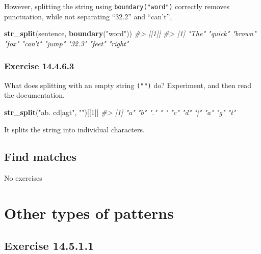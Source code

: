 \documentclass[]{book}
\newenvironment{Shaded}{\begin{snugshade}}{\end{snugshade}}
\newcommand{\CommentTok}[1]{\textcolor[rgb]{0.56,0.35,0.01}{\textit{#1}}}
\newcommand{\DecValTok}[1]{\textcolor[rgb]{0.00,0.00,0.81}{#1}}
\newcommand{\KeywordTok}[1]{\textcolor[rgb]{0.13,0.29,0.53}{\textbf{#1}}}
\newcommand{\NormalTok}[1]{#1}
\newcommand{\StringTok}[1]{\textcolor[rgb]{0.31,0.60,0.02}{#1}}
\theoremstyle{plain}
\theoremstyle{remark}
\begin{document}
However, splitting the string using \texttt{boundary("word")} correctly
removes punctuation, while not separating ``32.2'' and ``can't'',

\begin{Shaded}
\begin{Highlighting}[]
\KeywordTok{str_split}\NormalTok{(sentence, }\KeywordTok{boundary}\NormalTok{(}\StringTok{"word"}\NormalTok{))}
\CommentTok{#> [[1]]}
\CommentTok{#> [1] "The"   "quick" "brown" "fox"   "can’t" "jump"  "32.3"  "feet"  "right"}
\end{Highlighting}
\end{Shaded}

\hypertarget{exercise-14.4.6.3}{%
\subsubsection*{\texorpdfstring{Exercise
{14.4.6.3}}{Exercise 14.4.6.3}}\label{exercise-14.4.6.3}}

What does splitting with an empty string \texttt{("")} do? Experiment,
and then read the documentation.

\begin{Shaded}
\begin{Highlighting}[]
\KeywordTok{str_split}\NormalTok{(}\StringTok{"ab. cd|agt"}\NormalTok{, }\StringTok{""}\NormalTok{)[[}\DecValTok{1}\NormalTok{]]}
\CommentTok{#>  [1] "a" "b" "." " " "c" "d" "|" "a" "g" "t"}
\end{Highlighting}
\end{Shaded}

It splits the string into individual characters.

\hypertarget{find-matches}{%
\subsection{Find matches}\label{find-matches}}

No exercises

\hypertarget{other-types-of-patterns}{%
\section{Other types of patterns}\label{other-types-of-patterns}}

\hypertarget{exercise-14.5.1.1}{%
\subsection*{\texorpdfstring{Exercise
{14.5.1.1}}{Exercise 14.5.1.1}}\label{exercise-14.5.1.1}}
\end{document}
